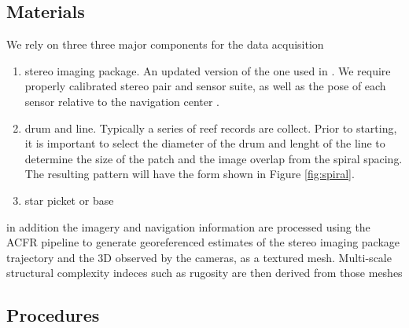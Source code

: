 \subsection{Materials}
We rely on three three major components for the data acquisition
\begin{enumerate}
\item stereo imaging package. An updated version of the one used in \cite{Henderson_2013} \cite{Camilli_2007}. We require properly calibrated stereo pair and sensor suite, as well as the pose of each sensor relative to the navigation center \cite{Johnson_Roberson_2013} \cite{}.
\item drum and line. Typically a series of reef records are collect. Prior to starting, it is important to select the diameter of the drum and lenght of the line to determine the size of the patch and the image overlap from the spiral spacing. The resulting pattern will have the form shown in Figure \ref{fig:spiral}.




\item star picket or base

\end{enumerate}



in addition the imagery and navigation information are processed using the ACFR pipeline \cite{Johnson_Roberson_2010} \cite{Mahon_2008} \cite{Johnson_Roberson_2013} to generate georeferenced estimates of the stereo imaging package trajectory and the 3D observed by the cameras, as a textured mesh. Multi-scale structural complexity indeces such as rugosity are then derived from those meshes \cite{Friedman_2012} 

\subsection{Procedures}

